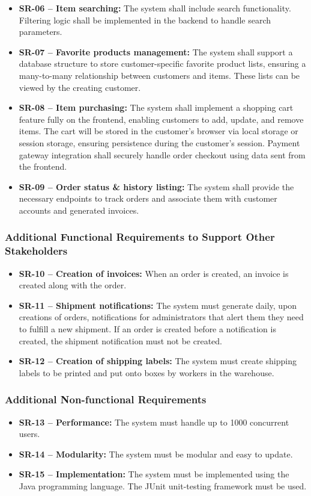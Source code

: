 \documentclass[twoside,a4paper,journal]{IEEEtran}
\begin{document}
\begin{itemize}
  \item \textbf{SR-06 -- Item searching: }The system shall include
  search functionality. Filtering logic shall be implemented in the backend to
  handle search parameters.
  \item \textbf{SR-07 -- Favorite products management:} The system
  shall support a database structure to store customer-specific favorite product
  lists, ensuring a many-to-many relationship between customers and items. These
  lists can be viewed by the creating customer.
  \item \textbf{SR-08 -- Item purchasing:} The system shall
  implement a shopping cart feature fully on the frontend, enabling customers to
  add, update, and remove items. The cart will be stored in the customer's
  browser via local storage or session storage, ensuring persistence during the customer's
  session. Payment gateway integration shall securely handle order checkout using
  data sent from the frontend.
  \item \textbf{SR-09 -- Order status \& history listing:} The system shall provide the necessary
  endpoints to track orders and associate them with customer accounts and
  generated invoices.
\end{itemize}
\subsubsection{Additional Functional Requirements to Support Other Stakeholders}
\begin{itemize}
  \item \textbf{SR-10 -- Creation of invoices: }When an order is
  created, an invoice is created along with the order.
  \item \textbf{SR-11 -- Shipment notifications:} The system must
  generate daily, upon creations of orders, notifications for administrators that
  alert them they need to fulfill a new shipment. If an order is created before a
  notification is created, the shipment notification must not be created.
  \item \textbf{SR-12 -- Creation of shipping labels:} The system must create shipping labels to be
  printed and put onto boxes by workers in the warehouse.
\end{itemize}
\subsubsection{Additional Non-functional Requirements}
\begin{itemize}
  \item \textbf{SR-13 -- Performance:} The system must handle up to
  1000 concurrent users.
  \item \textbf{SR-14 -- Modularity:} The system must be modular
  and easy to update.
  \item \textbf{SR-15 -- Implementation:} The system must be
  implemented using the Java programming language. The JUnit unit-testing
  framework must be used.
\end{itemize}
\end{document}
